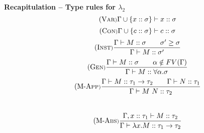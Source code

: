 \documentclass{beamer}
\begin{document}
\begin{frame}[fragile]{\bf Recapitulation -- Type rules for $\lambda_2$}
\vspace{-15pt}
\begin{equation}
\tag{V\scriptsize{AR}}
\Gamma \cup \{x :: \sigma\} \vdash x :: \sigma
\end{equation}
\vspace{-10pt}
\begin{equation}
\tag{C\scriptsize{ON}}
\Gamma \cup \{c :: \sigma\} \vdash c :: \sigma
\end{equation}
\vspace{-5pt}
\begin{equation}
\tag{I\scriptsize{NST}}
\frac{\Gamma \vdash M :: \sigma \qquad \sigma^\prime \geq \sigma}{\Gamma \vdash M :: \sigma^\prime}
\end{equation}
\vspace{1pt}
\begin{equation}
\tag{G\scriptsize{EN}}
\frac{\Gamma \vdash M :: \sigma \qquad \alpha \notin FV(\Gamma)}{\Gamma \vdash M :: \forall \alpha.\sigma}
\end{equation}
\vspace{1pt}
\begin{equation}
\tag{M-A\scriptsize{PP}}
\frac{\Gamma \vdash M :: \tau_1 \rightarrow \tau_2 \qquad \Gamma \vdash N :: \tau_1}{\Gamma \vdash M ~N :: \tau_2}
\end{equation}
\\
\begin{equation}
\tag{M-A\scriptsize{BS}}
\frac{\Gamma,x :: \tau_1 \vdash M :: \tau_2}{\Gamma \vdash \lambda x.M :: \tau_1 \rightarrow \tau_2}
\end{equation}

\end{frame}
\end{document}
